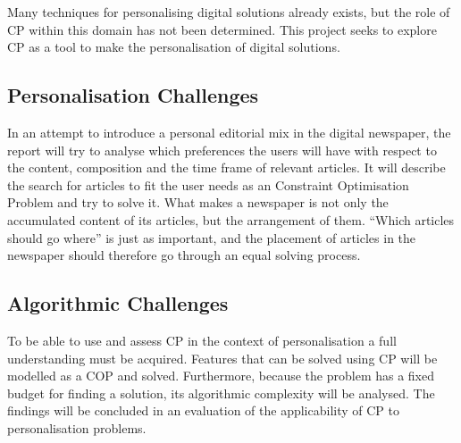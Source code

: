 Many techniques for personalising digital solutions already exists, but the role of CP within this domain has not been determined. This project seeks to explore CP as a tool to make the personalisation of digital solutions.%

\subsection{Personalisation Challenges}
In an attempt to introduce a personal editorial mix in the digital newspaper, the report will try to analyse which preferences the users will have with respect to the content, composition and the time frame of relevant articles. It will describe the search for articles to fit the user needs as an Constraint Optimisation Problem and try to solve it. What makes a newspaper is not only the accumulated content of its articles, but the arrangement of them. ``Which articles should go where'' is just as important, and the placement of articles in the newspaper should therefore go through an equal solving process.

\subsection{Algorithmic Challenges}
To be able to use and assess CP in the context of personalisation a full understanding must be acquired. Features that can be solved using CP will be modelled as a COP and solved. Furthermore, because the problem has a fixed budget for finding a solution, its algorithmic complexity will be analysed. The findings will be concluded in an evaluation of the applicability of CP to personalisation problems.

